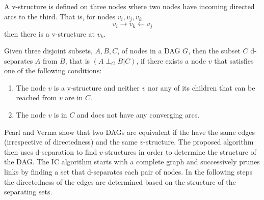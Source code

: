     \begin{definition}[v-structure]
        A v-structure is defined on three nodes
        where two nodes have incoming directed arcs
        to the third. That is, for nodes $v_i,v_j,v_k$
        \[
            v_i \rightarrow v_k \leftarrow v_j
        \]
        then there is a v-structure at $v_k$.
     \end{definition} 

    \begin{definition}[d-separation]
        Given three disjoint subsets, $A,B,C$, of 
        nodes in a DAG $G$, then the subset $C$
        d-separates $A$ from $B$, that is 
        $(A \perp_G B|C)$, if there exists
        a node $v$ that satisfies one of the 
        following conditions: 
        \begin{enumerate}
            \item The node $v$ is a v-structure
            and neither $v$ nor any of its children 
            that can be reached from $v$ are in $C$.
            \item The node $v$ is in $C$ and does
            not have any converging arcs.
        \end{enumerate}
    \end{definition}
    \cite{Scutari2014}

    Pearl and Verma show that two DAGs are equivalent
    if the have the same edges (irrespective of
    directedness) and the same $v$-structure. 
    The proposed algorithm then uses d-separation to
    find $v$-structures in order to determine 
    the structure of the DAG. The IC algorithm
     starts with a complete graph
    and successively prunes links by finding
    a set that d-separates each
    pair of nodes. In the following steps the 
    directedness of the edges are determined 
    based on the structure of the separating
    sets.


